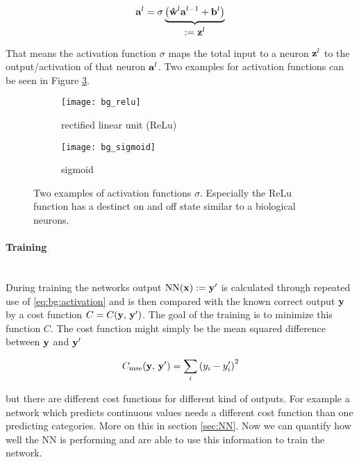 \begin{equation} \label{eq:bg:activation}
    \vb{a}^l = \sigma \underbrace{
    \qty(\vu{w}^l \vb{a}^{l-1} + \vb{b}^l)
    }_{
    \textstyle
    := \vb z^l
    }
\end{equation}

That means the activation function $\sigma$ maps the total input to a neuron $\vb z^l$ to the output/activation of that neuron $\vb a^l$. Two examples for activation functions can be seen in Figure \ref{fig:al:act}.

\begin{figure}[H]
\centering
\begin{subfigure}{.5\textwidth}
    \centering
    \texttt{[image: bg\_relu]}
    \caption{rectified linear unit (ReLu)}
    \label{}
\end{subfigure}%
\begin{subfigure}{.5\textwidth}
    \centering
    \texttt{[image: bg\_sigmoid]}
    \caption{sigmoid}
    \label{}
\end{subfigure}
\caption{Two examples of activation functions $\sigma$. Especially the ReLu function has a destinct on and off state similar to a biological neurons.}
\label{fig:al:act}
\end{figure}

\paragraph{Training}~\\ \label{par:training}
During training the networks output $\mathrm{NN}(\vb x) := \vb{y}' $ is calculated through repeated use of \eqref{eq:bg:activation} and is then compared with the known correct output $\vb y$ by a cost function $C = C(\vb y, \, \vb y')$. The goal of the training is to minimize this function $C$. The cost function might simply be the mean squared difference between $\vb y$ and $\vb y'$

\begin{equation}
    C_{\mathrm{mse}}(\vb y, \, \vb y') = \sum_i \qty(y_i - y_i')^2
\end{equation}

\noindent
but there are different cost functions for different kind of outputs. For example a network which predicts continuous values needs a different cost function than one predicting categories. More on this in section \ref{sec:NN}. Now we can quantify how well the NN is performing and are able to use this information to train the network.
\\


